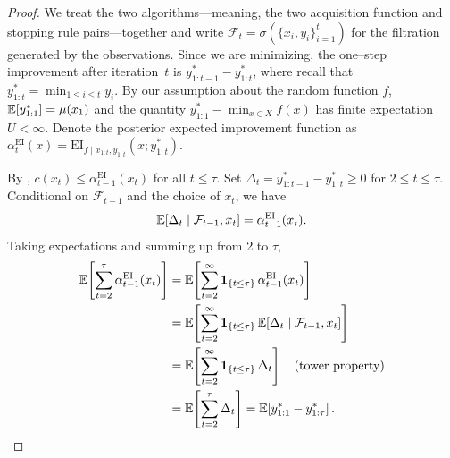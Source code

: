 \ThmPositiveUtil*

\begin{proof}
We treat the two algorithms---meaning, the two acquisition function and stopping rule pairs---together and write
$
\mathcal F_{t}=\sigma\!\left(\{x_i,y_i\}_{i=1}^{t}\right)
$
for the filtration generated by the observations.
Since we are minimizing, the one–step improvement after
iteration~$t$ is
$y_{1:t-1}^*-y_{1:t}^*$, where recall that $y_{1:t}^* = \min_{1 \leq i \leq t} y_i$.
By our assumption about the random function $f$, 
$\mathbb{E}[y_{1:1}^*] = \mu(x_1)$ and
the quantity $y_{1:1}^*-\min\nolimits_{x\in X}f(x)$ has finite expectation $U<\infty$. Denote the posterior expected improvement function as $\alpha_{t}^{\mathrm{EI}}(x) = \mathrm{EI}_{f \mid x_{1:t}, y_{1:t}}\left(x; y^*_{1:t}\right)$. 


By , $c(x_t)\le \alpha_{t-1}^{\mathrm{EI}}(x_t)$ for all $t\leq\tau$. Set
$
\Delta_t = y_{1:t-1}^* - y_{1:t}^* \ge 0
$
for $2\leq t\leq\tau$.
Conditional on $\mathcal F_{t-1}$ and the choice of $x_t$, we have
\begin{equation}
\mathbb{E}[\Delta_t \mid \mathcal F_{t-1},x_t]
      = \alpha_{t-1}^{\mathrm{EI}}(x_t).
\end{equation}      
Taking expectations and summing up from 2 to $\tau$, 
\begin{align}
\mathbb{E}\!\left[\sum_{t=2}^{\tau}\alpha^{\mathrm{EI}}_{t-1}(x_t)\right]
&= \mathbb{E}\!\left[\sum_{t=2}^{\infty}\mathbf{1}_{\{t\le \tau\}}\,
      \alpha^{\mathrm{EI}}_{t-1}(x_t)\right] \nonumber\\
&= \mathbb{E}\!\left[\sum_{t=2}^{\infty}\mathbf{1}_{\{t\le \tau\}}\,
      \mathbb{E}\!\left[\Delta_t \mid \mathcal F_{t-1}, x_t\right]\right] \nonumber
\\
&= \mathbb{E}\!\left[\sum_{t=2}^{\infty}\mathbf{1}_{\{t\le \tau\}}\,\Delta_t\right]       \quad(\text{tower property}) 
 \nonumber\\
&= \mathbb{E}\!\left[\sum_{t=2}^{\tau}\Delta_t\right]= \mathbb{E}\!\left[y^*_{1:1} - y^*_{1:\tau}\right]. \label{eq:max_total_improvment}
\end{align}


\end{proof}
